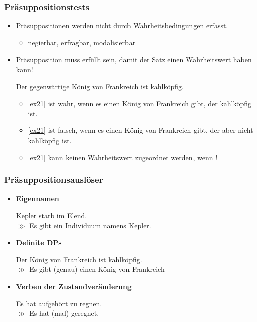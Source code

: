 
\begin{frame}
\frametitle{Präsuppositionstests}

\begin{itemize}
	\item Präsuppositionen werden nicht durch Wahrheitsbedingungen erfasst.
	
	\begin{itemize}
		\item negierbar, erfragbar, modalisierbar
	\end{itemize}
	
	\item Präsupposition muss erfüllt sein, damit der Satz einen Wahrheitswert haben kann!
	
	\ea \label{ex21} Der gegenwärtige König von Frankreich ist kahlköpfig.
	\z
		
		\begin{itemize}
			\item \ref{ex21} ist wahr, wenn es einen König von Frankreich gibt, der kahlköpfig ist.
			\item \ref{ex21} ist falsch, wenn es einen König von Frankreich gibt, der aber nicht kahlköpfig ist.
			\item \ref{ex21} kann keinen Wahrheitswert zugeordnet werden, wenn !
		\end{itemize}

\end{itemize}

\end{frame}



\begin{frame}
\frametitle{Präsuppositionsauslöser}

\begin{itemize}
	\item \textbf{Eigennamen}
	
	\ea Kepler starb im Elend. \\ $\gg$ Es gibt ein Individuum namens Kepler.
	\z

	\item \textbf{Definite DPs}
	
	\ea Der König von Frankreich ist kahlköpfig.\\ 
	$\gg$ Es gibt (genau) einen König von Frankreich
	\z
	
	\item \textbf{Verben der Zustandveränderung}

	\ea Es hat aufgehört zu regnen.\\
			$\gg$ Es hat (mal) geregnet.
	\z

\end{itemize}

\end{frame}


